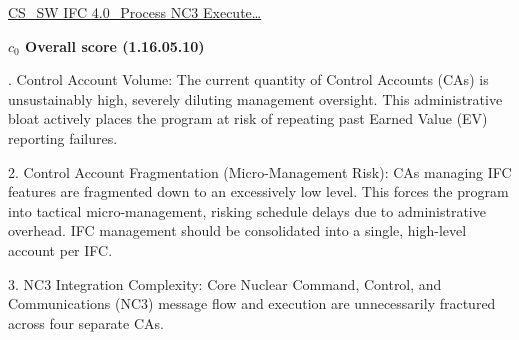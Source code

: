 % 


\begin{frame}{\href{run:../local/source-docs/1.16.05.10.pdf}{CS\_SW IFC 4.0\_Process NC3 Execute\ldots{}}}
\centering
{}
\par
\vspace{0.75em}
\textbf{\small{\(c_0\) Overall score {\tiny (1.16.05.10)}}}\\\par
\vspace{0.5em}
\begin{minipage}{0.85\textwidth}
\raggedright
\fontsize{7}{9}. Control Account Volume: The current quantity of Control Accounts (CAs) is unsustainably high, severely diluting management oversight. This administrative bloat actively places the program at risk of repeating past Earned Value (EV) reporting failures.\par\vspace{0.5em}2. Control Account Fragmentation (Micro-Management Risk): CAs managing IFC features are fragmented down to an excessively low level. This forces the program into tactical micro-management, risking schedule delays due to administrative overhead. IFC management should be consolidated into a single, high-level account per IFC.\par\vspace{0.5em}3. NC3 Integration Complexity: Core Nuclear Command, Control, and Communications (NC3) message flow and execution are unnecessarily fractured across four separate CAs.\par
\end{minipage}
\end{frame}
